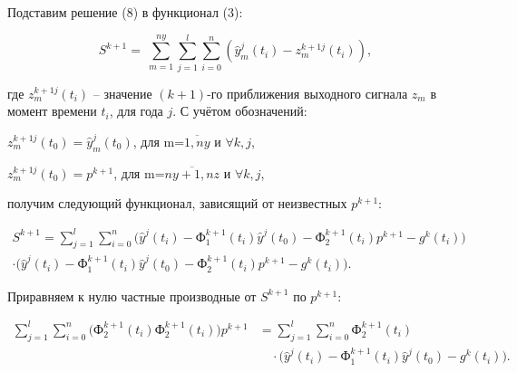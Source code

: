 \begin{multicols}{2}
Подставим решение (8) в функционал (3):

\begin{equation}
S^{k + 1} = \ \sum_{m = 1}^{ny}{\sum_{j = 1}^{l}{\sum_{i = 0}^{n}\left( {\widehat{y}}_{m}^{j}\left( t_{i} \right) - z_{m}^{k + 1j}(t_{i}) \right)}},
\end{equation}

где
\(z_{m}^{k + 1j}(t_{i})\)
-- значение \((k + 1)\)-го приближения выходного сигнала \(z_{m}\) в
момент времени \(t_{i}\), для года $j$. С учётом обозначений:

\(z_{m}^{k + 1j}\left( t_{0} \right) = {\widehat{y}}_{m}^{j}(t_{0})\),
для m=\(\overline{1,ny}\) и $∀ k, j$,

\(z_{m}^{k + 1j}\left( t_{0} \right) = p^{k + 1}\),
для m=\(\overline{ny + 1,nz}\) и $∀ k, j$,

получим следующий функционал, зависящий от неизвестных
\(p^{k + 1}\):
\end{multicols}

\begin{equation}
\begin{split}
S^{k + 1} = \sum_{j = 1}^{l} \sum_{i = 0}^{n} \Big( \widehat{y}^{j}(t_{i}) 
    - \text{Ф}_{1}^{k + 1}(t_{i}) \widehat{y}^{j}(t_{0}) 
    - \text{Ф}_{2}^{k + 1}(t_{i}) p^{k + 1} - g^{k}(t_{i}) \Big) \\
    \cdot \Big( \widehat{y}^{j}(t_{i}) 
    - \text{Ф}_{1}^{k + 1}(t_{i}) \widehat{y}^{j}(t_{0}) 
    - \text{Ф}_{2}^{k + 1}(t_{i}) p^{k + 1} - g^{k}(t_{i}) \Big).
\end{split}
\end{equation}

Приравняем к нулю частные производные от
\(S^{k + 1}\) по
\(p^{k + 1}\):

\begin{equation}
\begin{split}
\sum_{j = 1}^{l} \sum_{i = 0}^{n} 
\Big( \text{Ф}_{2}^{k + 1}(t_{i}) \text{Ф}_{2}^{k + 1}(t_{i}) \Big) p^{k + 1} 
&= \sum_{j = 1}^{l} \sum_{i = 0}^{n} \text{Ф}_{2}^{k + 1}(t_{i}) \\
&\quad \cdot \Big( \widehat{y}^{j}(t_{i}) 
    - \text{Ф}_{1}^{k + 1}(t_{i}) \widehat{y}^{j}(t_{0}) 
    - g^{k}(t_{i}) \Big).
\end{split}
\end{equation}

